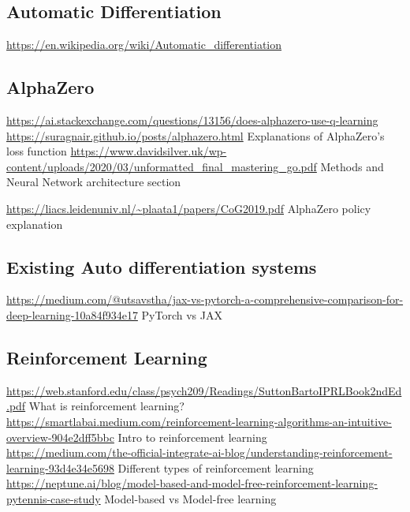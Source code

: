 \documentclass{article}
\begin{document}
    \subsection{Automatic Differentiation}
    \noindent \url{https://en.wikipedia.org/wiki/Automatic_differentiation}

    \subsection{AlphaZero}
    \noindent \url{https://ai.stackexchange.com/questions/13156/does-alphazero-use-q-learning}
    \noindent \url{https://suragnair.github.io/posts/alphazero.html}
    Explanations of AlphaZero's loss function
    \noindent \url{https://www.davidsilver.uk/wp-content/uploads/2020/03/unformatted_final_mastering_go.pdf} Methods and Neural Network architecture section

    \noindent \url{https://liacs.leidenuniv.nl/~plaata1/papers/CoG2019.pdf}
    AlphaZero policy explanation

    \subsection{Existing Auto differentiation systems}
    \noindent \url{https://medium.com/@utsavstha/jax-vs-pytorch-a-comprehensive-comparison-for-deep-learning-10a84f934e17}
    PyTorch vs JAX

    \subsection{Reinforcement Learning}
    \noindent \url{https://web.stanford.edu/class/psych209/Readings/SuttonBartoIPRLBook2ndEd.pdf} What is reinforcement learning?\\
    \noindent \url{https://smartlabai.medium.com/reinforcement-learning-algorithms-an-intuitive-overview-904e2dff5bbc} Intro to reinforcement learning\\
    \noindent \url{https://medium.com/the-official-integrate-ai-blog/understanding-reinforcement-learning-93d4e34e5698} Different types of reinforcement learning\\
    \noindent \url{https://neptune.ai/blog/model-based-and-model-free-reinforcement-learning-pytennis-case-study} Model-based vs Model-free learning\\
\end{document}
